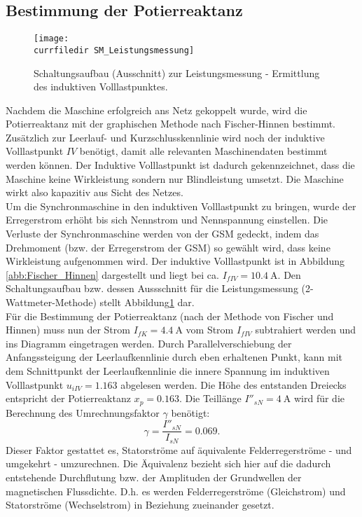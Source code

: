 \subsection{Bestimmung der Potierreaktanz}
\label{subsec:potierreaktanz}
\begin{figure}
    \centering
    \texttt{[image: \\currfiledir SM\_Leistungsmessung]}
    \caption{Schaltungsaufbau (Ausschnitt) zur Leistungsmessung - Ermittlung des induktiven Volllastpunktes.}
    \label{fig:SM_Leistungsmessung}
\end{figure}
Nachdem die Maschine erfolgreich ans Netz gekoppelt wurde, wird die Potierreaktanz mit der graphischen Methode nach Fischer-Hinnen bestimmt.\\
Zusätzlich zur Leerlauf- und Kurzschlusskennlinie wird noch der induktive Volllastpunkt $IV$ benötigt, damit alle relevanten Maschinendaten bestimmt werden können. Der Induktive Volllastpunkt ist dadurch gekennzeichnet, dass die Maschine keine Wirkleistung sondern nur Blindleistung umsetzt. Die Maschine wirkt also kapazitiv aus Sicht des Netzes.\\
Um die Synchronmaschine in den induktiven Volllastpunkt zu bringen, wurde der Erregerstrom erhöht bis sich Nennstrom und Nennspannung einstellen. Die Verluste der Synchronmaschine werden von der GSM gedeckt, indem das Drehmoment (bzw. der Erregerstrom der GSM) so gewählt wird, dass keine Wirkleistung aufgenommen wird. Der induktive Volllastpunkt ist in Abbildung \ref{abb:Fischer_Hinnen} dargestellt und liegt bei ca. $I_{fIV} = \SI{10.4}{\ampere}$. Den Schaltungsaufbau bzw. dessen Aussschnitt für die Leistungsmessung (2-Wattmeter-Methode) stellt Abbildung\;\ref{fig:SM_Leistungsmessung} dar.\\
Für die Bestimmung der Potierreaktanz (nach der Methode von Fischer und Hinnen) muss nun der Strom $I_{fK}= \SI{4.4}{\ampere}$ vom Strom $I_{fIV}$ subtrahiert werden und ins Diagramm eingetragen werden. Durch Parallelverschiebung der Anfangssteigung der Leerlaufkennlinie durch eben erhaltenen Punkt, kann mit dem Schnittpunkt der Leerlaufkennlinie die innere Spannung im induktiven Volllastpunkt $u_{iIV} = 1.163$ abgelesen werden. Die Höhe des entstanden Dreiecks entspricht der Potierreaktanz $x_p = 0.163$. Die Teillänge $I''_{sN}= \SI{4}{\ampere}$ wird für die Berechnung des Umrechnungsfaktor $\gamma$ benötigt:
\begin{equation*}
    \gamma = \frac{I''_{sN}}{I_{sN}} = 0.069.
\end{equation*}
Dieser Faktor gestattet es, Statorströme auf äquivalente Felderregerströme - und umgekehrt - umzurechnen. Die Äquivalenz bezieht sich hier auf die dadurch entstehende Durchflutung bzw. der Amplituden der Grundwellen der magnetischen Flussdichte. D.h. es werden Felderregerströme (Gleichstrom) und Statorströme (Wechselstrom) in Beziehung zueinander gesetzt.\\

